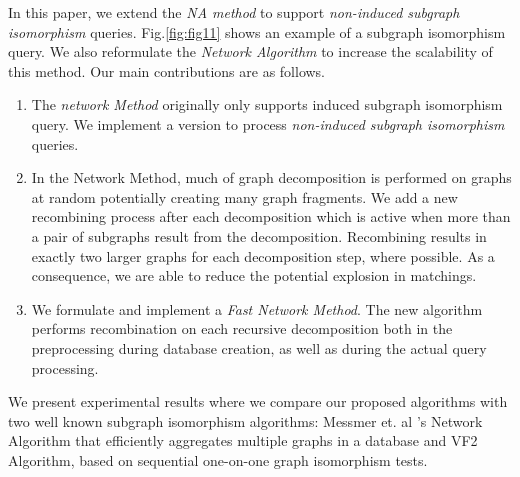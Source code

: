 In this paper, we extend the \textit{NA method} to support \textit{non-induced subgraph isomorphism} queries.
Fig.\ref{fig:fig11} shows an example of a subgraph isomorphism query. We also reformulate the \textit{Network Algorithm} to increase the scalability of this method.
Our main contributions are as follows.

\begin{enumerate}
\item The \textit{network Method} originally only supports induced subgraph isomorphism query. We implement a version to process \textit{non-induced subgraph isomorphism} queries.
\item  In the Network Method, much of graph decomposition is performed on graphs at random potentially creating many graph fragments. We add a new recombining process after each decomposition which is active when more than a pair of  subgraphs result from the decomposition.  Recombining results in exactly  two larger graphs for each decomposition step, where possible.  As a consequence, we are able to reduce the potential  explosion in matchings. 
\item We formulate and implement  a  \textit{Fast Network Method}. The new algorithm performs recombination on  each recursive decomposition both in the  preprocessing during database creation, as well as during the actual query processing. 
\end{enumerate}

We present experimental results where we compare our proposed algorithms with two well known subgraph isomorphism algorithms: Messmer et. al 's\cite{messmer} Network Algorithm that efficiently aggregates multiple graphs in a database
 and VF2\cite{vf} Algorithm, based on sequential one-on-one graph isomorphism tests. 
